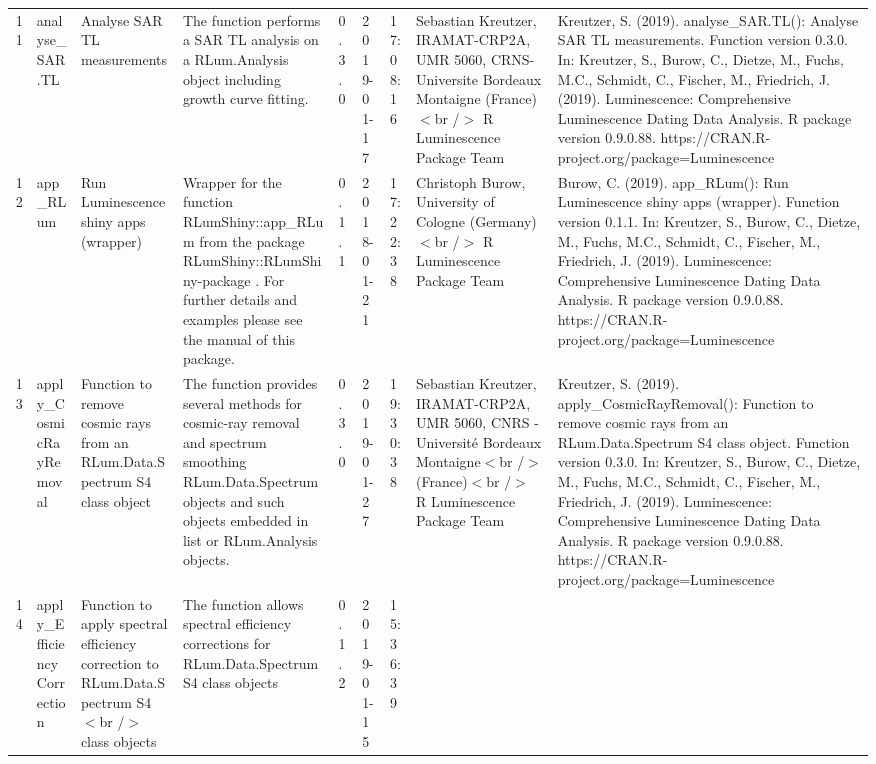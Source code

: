 \begin{table}[ht]
\begin{tabular}{rllllllll}
 \\ 
  11 & analyse\_SAR.TL & Analyse SAR TL measurements & The function performs a SAR TL analysis on a RLum.Analysis  object including growth curve fitting. & 0.3.0 & 2019-01-17 & 17:08:16
 & Sebastian Kreutzer, IRAMAT-CRP2A, UMR 5060, CRNS-Universite Bordeaux Montaigne (France)$<$br /$>$  R Luminescence Package Team & Kreutzer, S. (2019). analyse\_SAR.TL(): Analyse SAR TL measurements. Function version 0.3.0. In: Kreutzer, S., Burow, C., Dietze, M., Fuchs, M.C., Schmidt, C., Fischer, M., Friedrich, J. (2019). Luminescence: Comprehensive Luminescence Dating Data Analysis. R package version 0.9.0.88. https://CRAN.R-project.org/package=Luminescence
 \\ 
  12 & app\_RLum & Run Luminescence shiny apps (wrapper) & Wrapper for the function  RLumShiny::app\_RLum  from the package RLumShiny::RLumShiny-package . For further details and examples please see the manual of this package. & 0.1.1 & 2018-01-21 & 17:22:38
 & Christoph Burow, University of Cologne (Germany)$<$br /$>$  R Luminescence Package Team & Burow, C. (2019). app\_RLum(): Run Luminescence shiny apps (wrapper). Function version 0.1.1. In: Kreutzer, S., Burow, C., Dietze, M., Fuchs, M.C., Schmidt, C., Fischer, M., Friedrich, J. (2019). Luminescence: Comprehensive Luminescence Dating Data Analysis. R package version 0.9.0.88. https://CRAN.R-project.org/package=Luminescence
 \\ 
  13 & apply\_CosmicRayRemoval & Function to remove cosmic rays from an RLum.Data.Spectrum S4 class object & The function provides several methods for cosmic-ray removal and spectrum smoothing  RLum.Data.Spectrum  objects and such objects embedded in  list  or RLum.Analysis  objects. & 0.3.0 & 2019-01-27 & 19:30:38
 & Sebastian Kreutzer, IRAMAT-CRP2A, UMR 5060, CNRS - Université Bordeaux Montaigne$<$br /$>$ (France)$<$br /$>$  R Luminescence Package Team & Kreutzer, S. (2019). apply\_CosmicRayRemoval(): Function to remove cosmic rays from an RLum.Data.Spectrum S4 class object. Function version 0.3.0. In: Kreutzer, S., Burow, C., Dietze, M., Fuchs, M.C., Schmidt, C., Fischer, M., Friedrich, J. (2019). Luminescence: Comprehensive Luminescence Dating Data Analysis. R package version 0.9.0.88. https://CRAN.R-project.org/package=Luminescence
 \\ 
  14 & apply\_EfficiencyCorrection & Function to apply spectral efficiency correction to RLum.Data.Spectrum S4$<$br /$>$ class objects & The function allows spectral efficiency corrections for RLum.Data.Spectrum S4 class objects & 0.1.2 & 2019-01-15 & 15:36:39

\end{tabular}
\end{table}
